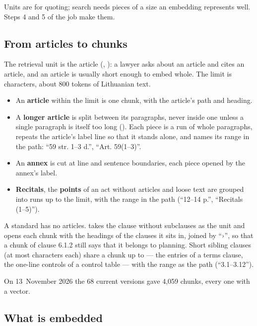 Units are for quoting; search needs pieces of a size an embedding represents well. Steps 4
and 5 of the job make them.

\subsection{From articles to chunks}\label{sec:corpus:chunking}

The retrieval unit is the article (, ): a lawyer
asks about an article and cites an article, and an article is usually short enough to embed
whole. The limit is  characters, about 800 tokens of Lithuanian
text.

\begin{itemize}
  \item An \textbf{article} within the limit is one chunk, with the article's path and
    heading.
  \item A \textbf{longer article} is split between its paragraphs, never inside one unless a
    single paragraph is itself too long (). Each piece is a run of whole
    paragraphs, repeats the article's label line so that it stands alone, and names its range
    in the path: \enquote{59 str. 1–3 d.}, \enquote{Art. 59(1–3)}.
  \item An \textbf{annex} is cut at line and sentence boundaries, each piece opened by the
    annex's label.
  \item \textbf{Recitals}, the \textbf{points} of an act without articles and loose text are
    grouped into runs up to the limit, with the range in the path
    (\enquote{12–14 p.}, \enquote{Recitals (1–5)}).
\end{itemize}

A standard has no articles.  takes the clause without subclauses
as the unit and opens each chunk with the headings of the clauses it sits in, joined by
\enquote{›}, so that a chunk of clause 6.1.2 still says that it belongs to planning. Short
sibling clauses (at most  characters each) share a chunk up to
 --- the entries of a terms clause, the one-line controls of a control
table --- with the range as the path (\enquote{3.1–3.12}).

On 13~November 2026 the 68 current versions gave 4,059 chunks, every one with a vector.

\subsection{What is embedded}\label{sec:corpus:embed}

